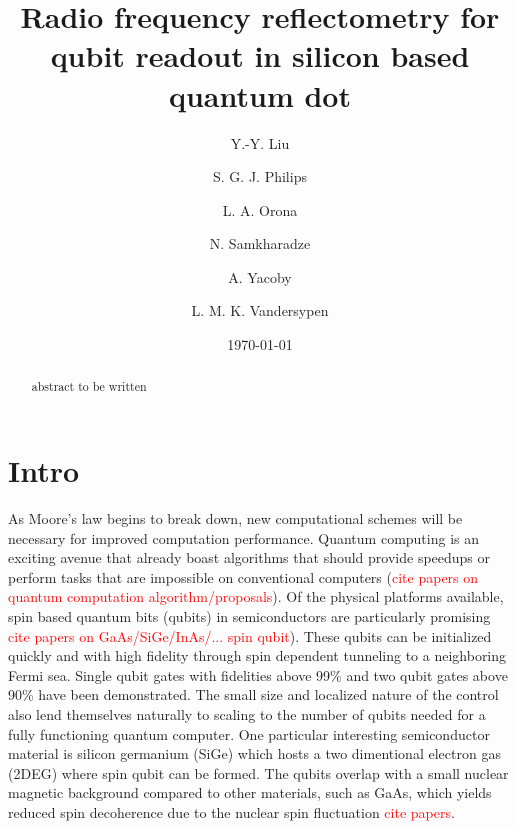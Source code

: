 \documentclass[twocolumn]{article}
\begin{document}
	
\title{Radio frequency reflectometry for qubit readout in silicon based quantum dot}

\author{Y.-Y. Liu}
\author{S. G. J. Philips}
\author{L. A. Orona}
\author{N. Samkharadze}
\author{A. Yacoby}
\author{L. M. K. Vandersypen}

\date{\today}


\begin{abstract}
	abstract to be written
\end{abstract}

\maketitle

\section{Intro} %
	\label{sec:intro}
	As Moore’s law begins to break down, new computational schemes will be necessary for improved computation performance.  Quantum computing is an exciting avenue that already boast algorithms that should provide speedups or perform tasks that are impossible on conventional computers (\textcolor{red}{cite papers on quantum computation algorithm/proposals}).  Of the physical platforms available, spin based quantum bits (qubits) in semiconductors are particularly promising \cite{Morton11} \textcolor{red}{cite papers on GaAs/SiGe/InAs/... spin qubit}).  These qubits can be initialized quickly and with high fidelity through spin dependent tunneling to a neighboring Fermi sea.  Single qubit gates with fidelities above 99\% and two qubit gates above 90\% have been demonstrated.  The small size and localized nature of the control also lend themselves naturally to scaling to the number of qubits needed for a fully functioning quantum computer. One particular interesting semiconductor material is silicon germanium (SiGe) which hosts a two dimentional electron gas (2DEG) where spin qubit can be formed. The qubits overlap with a small nuclear magnetic background compared to other materials, such as GaAs, which yields reduced spin decoherence due to the nuclear spin fluctuation \textcolor{red}{cite papers}. 
\end{document}
